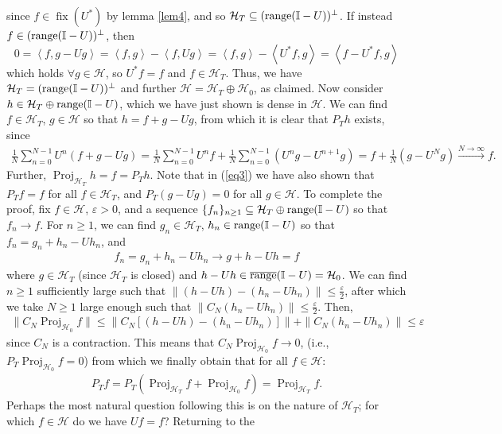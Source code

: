 \documentclass[11pt]{report}
\newcommand{\mc}[1]{\mathcal{#1}}
\newcommand{\ip}[2]{\left\langle#1,#2\right\rangle }
\DeclareMathOperator{\fix}{fix}
\DeclareMathOperator{\ran}{range}
\DeclareMathOperator{\proj}{Proj}
\theoremstyle{definition}
\begin{document}
    since $f\in\fix(U^\ast)$ by lemma \ref{lem4}, and so
    $\mc{H}_T\subseteq(\ran(\mbb{I}-U))^\perp$. If instead
    $f\in(\ran(\mbb{I}-U))^\perp$, then
    \[0=\ip{f}{g-Ug}=\ip{f}{g}-\ip{f}{Ug}=\ip{f}{g}-\ip{U^\ast
    f}{g}=\ip{f-U^\ast f}{g}\] which holds $\forall g\in\mc{H}$, so $U^\ast f=f$
    and $f\in\mc{H}_T$. Thus, we have $\mc{H}_T=(\ran(\mbb{I}-U))^\perp$ and
    further $\mc{H}=\mc{H}_T\oplus\mc{H}_0$, as claimed. Now consider
    $h\in\mc{H}_T\oplus \ran(\mbb{I}-U)$, which we have just shown is dense in
    $\mc{H}$. We can find $f\in\mc{H}_T$, $g\in\mc{H}$ so that $h=f+g-Ug$, from
    which it is clear that $P_Th$ exists, since
    \begin{align}
        \frac{1}{N}\sum_{n=0}^{N-1}U^n(f+g-Ug)=\frac{1}{N}\sum_{n=0}^{N-1}U^nf+\frac{1}{N}\sum_{n=0}^{N-1}(U^ng-U^{n+1}g)=f+\frac{1}{N}(g-U^Ng)\overset{N\rightarrow\infty}{\longrightarrow} f.\label{eq3}
    \end{align}
    Further, $\proj_{\mc{H}_T}h=f=P_Th$. Note that in (\ref{eq3}) we have also
    shown that $P_Tf=f$ for all $f\in\mc{H}_T$, and $P_T(g-Ug)=0$ for
    all $g\in\mc{H}$. To complete the proof, fix $f\in\mc{H}$, $\varepsilon>0$,
    and a sequence $\{f_n\}_{n\geq 1}\subseteq\mc{H}_T\oplus\ran(\mbb{I}-U)$ so
    that $f_n\rightarrow f$. For $n\geq 1$, we can find $g_n\in\mc{H}_T$,
    $h_n\in\ran(\mbb{I}-U)$ so that $f_n=g_n+h_n-Uh_n$, and 
    \begin{align*}
        f_n=g_n+h_n-Uh_n\longrightarrow g+h-Uh=f
    \end{align*}
    where $g\in\mc{H}_T$ (since $\mc{H}_T$ is closed) and
    $h-Uh\in\overline{\ran}(\mbb{I}-U)=\mc{H}_0$. We can find $n\geq 1$
    sufficiently large such that
    $\|(h-Uh)-(h_n-Uh_n)\|\leq\frac{\varepsilon}{2}$, after which we take $N\geq
    1$ large enough such that $\|C_N(h_n-Uh_n)\|\leq\frac{\varepsilon}{2}$.
    Then,
    \begin{align*}
        \|C_N\proj_{\mc{H}_0}f\|\leq\|C_N[(h-Uh)-(h_n-Uh_n)]\|+\|C_N(h_n-Uh_n)\|\leq \varepsilon
    \end{align*}
    since $C_N$ is a contraction. This means that
    $C_N\proj_{\mc{H}_0}f\rightarrow 0$, (i.e., $P_T\proj_{\mc{H}_0}f=0$) from
    which we finally obtain that for all $f\in\mc{H}$:
    \begin{align*}
        P_Tf=P_T(\proj_{\mc{H}_T}f+\proj_{\mc{H}_0}f)=\proj_{\mc{H}_T}f.\tag*{$\qed$}
    \end{align*}
    \indent Perhaps the most natural question following this is on the nature of
    $\mc{H}_T$; for which $f\in\mc{H}$ do we have $Uf=f$? Returning to the
\end{document}
